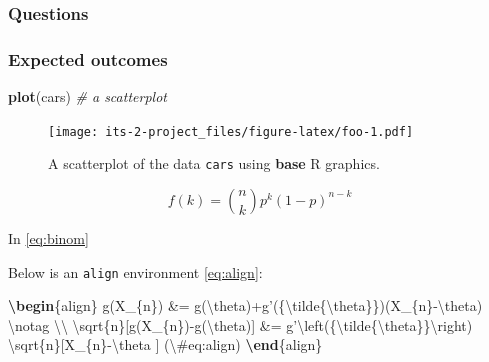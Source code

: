\documentclass[]{book}
\newenvironment{Shaded}{\begin{snugshade}}{\end{snugshade}}
\newcommand{\CommentTok}[1]{\textcolor[rgb]{0.56,0.35,0.01}{\textit{#1}}}
\newcommand{\ExtensionTok}[1]{#1}
\newcommand{\KeywordTok}[1]{\textcolor[rgb]{0.13,0.29,0.53}{\textbf{#1}}}
\newcommand{\NormalTok}[1]{#1}
\newcommand{\SpecialCharTok}[1]{\textcolor[rgb]{0.00,0.00,0.00}{#1}}
\newcommand{\SpecialStringTok}[1]{\textcolor[rgb]{0.31,0.60,0.02}{#1}}
\theoremstyle{definition}
\theoremstyle{definition}
\theoremstyle{definition}
\theoremstyle{remark}
\begin{document}
\hypertarget{questions-11}{%
\subsubsection*{Questions}\label{questions-11}}

\hypertarget{expected-outcomes-11}{%
\subsubsection*{Expected outcomes}\label{expected-outcomes-11}}




\begin{Shaded}
\begin{Highlighting}[]
\KeywordTok{plot}\NormalTok{(cars)  }\CommentTok{# a scatterplot}
\end{Highlighting}
\end{Shaded}

\begin{figure}
\centering
\texttt{[image: its-2-project\_files/figure-latex/foo-1.pdf]}
\caption{\label{fig:foo}A scatterplot of the data \texttt{cars} using \textbf{base} R
graphics.}
\end{figure}

\begin{equation}
f\left(k\right)=\binom{n}{k}p^k\left(1-p\right)^{n-k} \label{eq:binom}
\end{equation}

In \eqref{eq:binom}

Below is an \texttt{align} environment \eqref{eq:align}:

\begin{Shaded}
\begin{Highlighting}[]
\KeywordTok{\textbackslash{}begin}\NormalTok{\{}\ExtensionTok{align}\NormalTok{\}}\SpecialStringTok{ }
\SpecialStringTok{g(X_\{n\}) &= g(}\SpecialCharTok{\textbackslash{}theta}\SpecialStringTok{)+g'(\{}\SpecialCharTok{\textbackslash{}tilde}\SpecialStringTok{\{}\SpecialCharTok{\textbackslash{}theta}\SpecialStringTok{\}\})(X_\{n\}-}\SpecialCharTok{\textbackslash{}theta}\SpecialStringTok{) }\SpecialCharTok{\textbackslash{}notag}\SpecialStringTok{ }\SpecialCharTok{\textbackslash{}\textbackslash{}}
\SpecialCharTok{\textbackslash{}sqrt}\SpecialStringTok{\{n\}[g(X_\{n\})-g(}\SpecialCharTok{\textbackslash{}theta}\SpecialStringTok{)] &= g'}\SpecialCharTok{\textbackslash{}left}\SpecialStringTok{(\{}\SpecialCharTok{\textbackslash{}tilde}\SpecialStringTok{\{}\SpecialCharTok{\textbackslash{}theta}\SpecialStringTok{\}\}}\SpecialCharTok{\textbackslash{}right}\SpecialStringTok{)}
\SpecialStringTok{  }\SpecialCharTok{\textbackslash{}sqrt}\SpecialStringTok{\{n\}[X_\{n\}-}\SpecialCharTok{\textbackslash{}theta}\SpecialStringTok{ ] (}\SpecialCharTok{\textbackslash{}#}\SpecialStringTok{eq:align)}
\KeywordTok{\textbackslash{}end}\NormalTok{\{}\ExtensionTok{align}\NormalTok{\} }
\end{Highlighting}
\end{Shaded}
\end{document}

